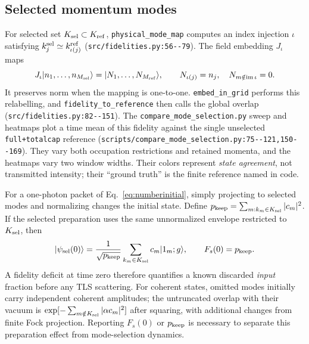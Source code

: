 \documentclass[11pt,a4paper]{article}
\newcommand{\ket}[1]{\lvert #1\rangle}
\newcommand{\code}[1]{\nolinkurl{#1}}
\begin{document}
\subsection{Selected momentum modes}
For selected set $K_{\rm sel}\subset K_{\rm ref}$, \code{physical_mode_map} computes an index injection $\iota$ satisfying $k_j^{\rm sel}\simeq k_{\iota(j)}^{\rm ref}$ (\code{src/fidelities.py:56--79}). The field embedding $J_\iota$ maps
\begin{equation}
 J_\iota\ket{n_1,\ldots,n_{M_{\rm sel}}}
 =\ket{N_1,\ldots,N_{M_{\rm ref}}},\qquad
 N_{\iota(j)}=n_j,\quad N_{m\notin\operatorname{im}\iota}=0.
 \label{eq:embedding}
\end{equation}
It preserves norm when the mapping is one-to-one. \code{embed_in_grid} performs this relabelling, and \code{fidelity_to_reference} then calls the global overlap (\code{src/fidelities.py:82--151}). The \code{compare_mode_selection.py} sweep and heatmaps plot a time mean of this fidelity against the single unselected \code{full+totalcap} reference (\code{scripts/compare_mode_selection.py:75--121,150--169}). They vary both occupation restrictions and retained momenta, and the heatmaps vary two window widths. Their colors represent \emph{state agreement}, not transmitted intensity; their ``ground truth'' is the finite reference named in code.

For a one-photon packet of Eq.~\eqref{eq:numberinitial}, simply projecting to selected modes and normalizing changes the initial state. Define $p_{\rm keep}=\sum_{m:k_m\in K_{\rm sel}}|c_m|^2$. If the selected preparation uses the same unnormalized envelope restricted to $K_{\rm sel}$, then
\begin{equation}
 \ket{\psi_{\rm sel}(0)}
 =\frac1{\sqrt{p_{\rm keep}}}\sum_{k_m\in K_{\rm sel}}c_m\ket{1_m;g},
 \qquad F_s(0)=p_{\rm keep}.
 \label{eq:modeinitial}
\end{equation}
A fidelity deficit at time zero therefore quantifies a known discarded \emph{input} fraction before any TLS scattering. For coherent states, omitted modes initially carry independent coherent amplitudes; the untruncated overlap with their vacuum is $\exp[-\sum_{m\notin K_{\rm sel}}|\alpha c_m|^2]$ after squaring, with additional changes from finite Fock projection. Reporting $F_s(0)$ or $p_{\rm keep}$ is necessary to separate this preparation effect from mode-selection dynamics.
\end{document}
